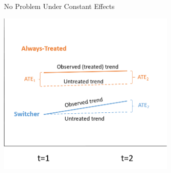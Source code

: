 \documentclass[11pt,english]{beamer}
\begin{document}
\begin{frame}{No Problem Under Constant Effects}

\vspace{0.7cm}
\begin{center}
	\includegraphics[width=0.65\textwidth]{figures/GB_2.png}
\end{center}

\end{frame}
\end{document}
